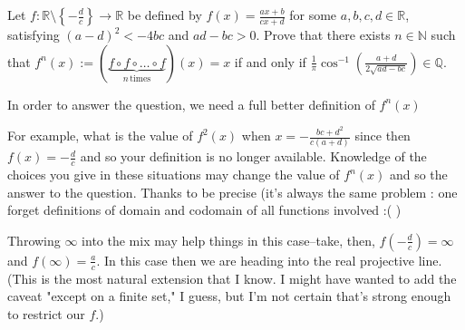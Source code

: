 \begin{solution}
	\begin{tcolorbox}Let $f: \mathbb{R} \setminus \left\{-\frac{d}{c}\right\} \to \mathbb{R}$ be defined by $f(x) = \frac{ax + b}{cx + d}$ for some $a, b, c, d \in \mathbb{R}$, satisfying $(a - d)^2 < -4bc$ and $ad - bc > 0$.
Prove that there exists $n \in \mathbb{N}$ such that $f^{n}(x) := (\underbrace{f \circ f \circ \dots \circ f}_{n \, \mathrm{times}})(x) = x$ if and only if $\frac{1}{\pi}\cos^{-1}\left(\frac{a+d}{2\sqrt{ad - bc}}\right) \in \mathbb{Q}$.\end{tcolorbox}
In order to answer the question, we need a full better definition of $f^n(x)$

For example, what is the value of $f^2(x)$ when $x=-\frac{bc+d^2}{c(a+d)}$ since then $f(x)=-\frac dc$ and so your definition is no longer available.
Knowledge of the choices you give in these situations may change the value of $f^n(x)$ and so the answer to the question.
Thanks to be precise (it's always the same problem : one forget definitions of domain and codomain of all functions involved :( )
\end{solution}



\begin{solution}
	Throwing $\infty$ into the mix may help things in this case--take, then, $f\left(-\frac{d}{c}\right) = \infty$ and $f(\infty) = \frac{a}{c}$. In this case then we are heading into the real projective line.
(This is the most natural extension that I know. I might have wanted to add the caveat "except on a finite set," I guess, but I'm not certain that's strong enough to restrict our $f$.)
\end{solution}



